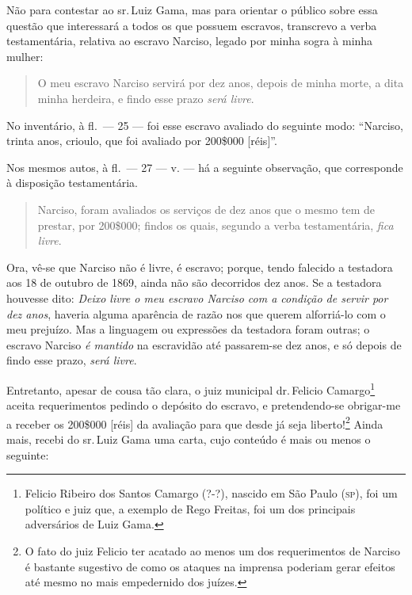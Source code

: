 Não para contestar ao sr.\,Luiz Gama, mas para orientar o público sobre
essa questão que interessará a todos os que possuem escravos, transcrevo
a verba testamentária, relativa ao escravo Narciso, legado por minha
sogra à minha mulher:

\begin{quote}
O meu escravo Narciso servirá por dez anos, depois de minha morte, a
dita minha herdeira, e findo esse prazo \emph{será livre}.
\end{quote}

No inventário, à fl.~--- 25 --- foi esse escravo avaliado do seguinte
modo: ``Narciso, trinta anos, crioulo, que foi avaliado por 200\$000
{[}réis{]}''.

Nos mesmos autos, à fl.~--- 27 --- v. --- há a seguinte observação, que
corresponde à disposição testamentária.

\begin{quote}
Narciso, foram avaliados os serviços de dez anos que o mesmo tem de
prestar, por 200\$000; findos os quais, segundo a verba testamentária,
\emph{fica livre}.
\end{quote}

Ora, vê-se que Narciso não é livre, é escravo; porque, tendo falecido a
testadora aos 18 de outubro de 1869, ainda não são decorridos dez anos.
Se a testadora houvesse dito: \emph{Deixo livre o meu escravo Narciso
com a condição de servir por dez anos}, haveria alguma aparência de
razão nos que querem alforriá-lo com o meu prejuízo. Mas a linguagem ou
expressões da testadora foram outras; o escravo Narciso \emph{é mantido}
na escravidão até passarem-se dez anos, e só depois de findo esse prazo,
\emph{será livre}.

Entretanto, apesar de cousa tão clara, o juiz municipal dr.\,Felicio
Camargo\footnote{ Felicio Ribeiro dos Santos Camargo (?-?), nascido
  em São Paulo (\textsc{sp}), foi um político e juiz que, a exemplo de Rego
  Freitas, foi um dos principais adversários de Luiz Gama.} aceita
requerimentos pedindo o depósito do escravo, e pretendendo-se obrigar-me
a receber os 200\$000 {[}réis{]} da avaliação para que desde já seja
liberto!\footnote{ O fato do juiz Felicio ter acatado ao menos um
  dos requerimentos de Narciso é bastante sugestivo de como os ataques
  na imprensa poderiam gerar efeitos até mesmo no mais empedernido dos
  juízes.} Ainda mais, recebi do sr.\,Luiz Gama uma carta, cujo conteúdo
é mais ou menos o seguinte:

